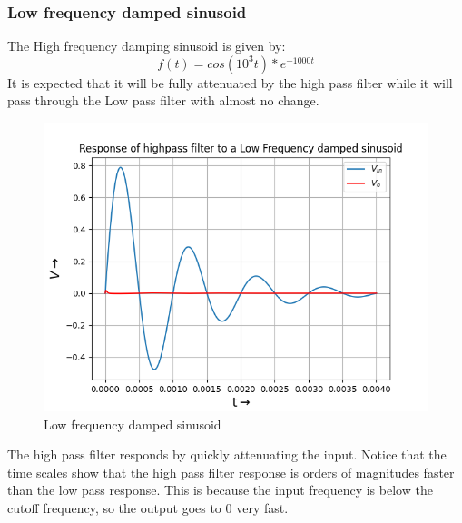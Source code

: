 \documentclass{article}
\begin{document}
\subsubsection{Low frequency damped sinusoid}
The High frequency damping sinusoid is given by:
\begin{equation}
	f(t) = cos(10^3t)*e^{-1000t}
\end{equation}
It is expected that it will be fully attenuated by the high pass filter while it will pass through the Low pass filter with almost no change.
\begin{figure}[h!]
	\centering
	\includegraphics[scale=0.6]{Figure_7.png}
	\caption{Low frequency damped sinusoid}
	\label{fig:System Response with Decay = 0.05}
\end{figure}

The high pass filter responds by quickly attenuating the input. Notice that the time scales show that the high pass filter response is orders of magnitudes faster than the low pass response. This is because the input frequency is below the cutoff frequency, so the output goes to $0$ very fast.
\end{document}
